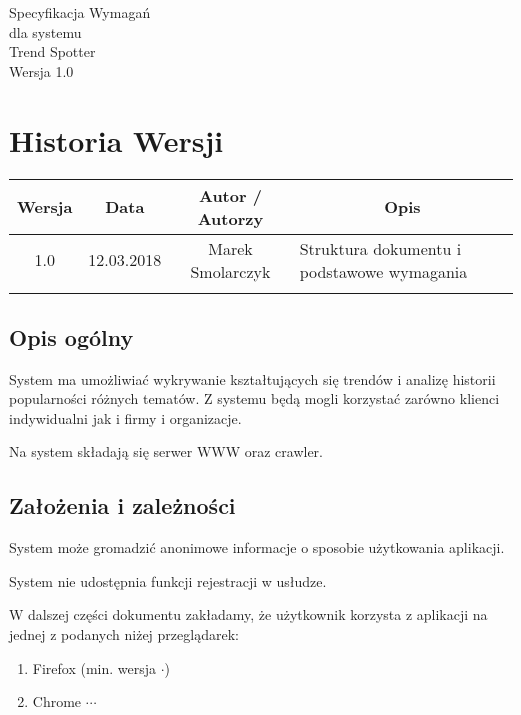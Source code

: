 \documentclass[a4paper]{scrreprt}
\def\version{1.0}
\begin{document}
\begin{flushright}\begin{bfseries}
	\Huge Specyfikacja Wymagań\\
	\vspace{1.5cm}
	\huge dla systemu\\
	\vspace{1.5cm}
	\Huge Trend Spotter\\
	\vfill
	\LARGE Wersja \version\\
\end{bfseries}\end{flushright}

\chapter*{Historia Wersji}

\begin{center}
    \begin{tabular}{|c|c|c|l|}
        \hline
	    \textbf{Wersja} & \textbf{Data} & \textbf{Autor / Autorzy} & \multicolumn{1}{|c|}{\textbf{Opis}}\\
        \hline
	    1.0 & 12.03.2018 & Marek Smolarczyk & Struktura dokumentu i podstawowe wymagania\\
        \hline
	     & & & \\
        \hline
    \end{tabular}
\end{center}

\newpage

\section*{Opis ogólny}
System ma umożliwiać wykrywanie kształtujących się trendów i analizę historii popularności różnych tematów. Z systemu będą mogli korzystać zarówno klienci indywidualni jak i firmy i organizacje.

Na system składają się serwer WWW oraz crawler.

\section*{Założenia i zależności}
System może gromadzić anonimowe informacje o sposobie użytkowania aplikacji.

System nie udostępnia funkcji rejestracji w usłudze.

W dalszej części dokumentu zakładamy, że użytkownik korzysta z aplikacji na jednej z podanych niżej przeglądarek:
\begin{enumerate}[label=\textbullet]
	\itemsep-0.1cm
	\item Firefox (min. wersja $\cdot$)
	\item Chrome $\cdots$
\end{enumerate}
\end{document}
